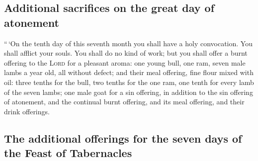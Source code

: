 \hypertarget{additional-sacrifices-on-the-great-day-of-atonement}{%
\subsection{Additional sacrifices on the great day of
atonement}\label{additional-sacrifices-on-the-great-day-of-atonement}}

 ``\,`On the tenth day of this seventh month you shall
have a holy convocation. You shall afflict your souls. You shall do no
kind of work;  but you shall offer a burnt offering to the
\textsc{Lord} for a pleasant aroma: one young bull, one ram, seven male
lambs a year old, all without defect;  and their meal
offering, fine flour mixed with oil: three tenths for the bull, two
tenths for the one ram,  one tenth for every lamb of the
seven lambs;  one male goat for a sin offering, in
addition to the sin offering of atonement, and the continual burnt
offering, and its meal offering, and their drink offerings.

\hypertarget{the-additional-offerings-for-the-seven-days-of-the-feast-of-tabernacles}{%
\subsection{The additional offerings for the seven days of the Feast of
Tabernacles}\label{the-additional-offerings-for-the-seven-days-of-the-feast-of-tabernacles}}

